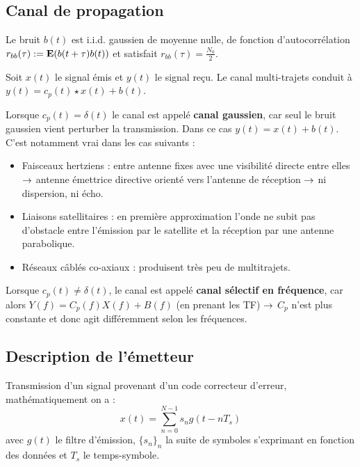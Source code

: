 \subsection{Canal de propagation}

	\begin{hyp}
		Le bruit $b(t)$ est i.i.d. gaussien de moyenne nulle, de fonction d'autocorrélation $r_{bb}(\tau) := \mathbf{E}(b(t + \tau) b(t))$ et satisfait $r_{bb}(\tau) = \frac{N_0}{2}$.
	\end{hyp}
	
	\begin{pop}
		Soit $x(t)$ le signal émis et $y(t)$ le signal reçu.
		Le canal multi-trajets conduit à $y(t) = c_p(t) \star x(t) + b(t)$.
	\end{pop}
	
	Lorsque $c_p(t) = \delta(t)$ le canal est appelé \textbf{canal gaussien}, car seul le bruit gaussien vient perturber la transmission.
	Dans ce cas $y(t) = x(t) + b(t)$.
	C'est notamment vrai dans les cas suivants :
	\begin{itemize}
	\item[\textbullet] Faisceaux hertziens : entre antenne fixes avec une visibilité directe entre elles $\rightarrow$ antenne émettrice directive orienté vers l'antenne de réception $\rightarrow$ ni dispersion, ni écho.
	\item[\textbullet] Liaisons satellitaires : en première approximation l'onde ne subit pas d'obstacle entre l'émission par le satellite et la réception par une antenne parabolique.
	\item[\textbullet] Réseaux câblés co-axiaux : produisent très peu de multitrajets.
	\end{itemize}
	
	Lorsque $c_p(t) \neq \delta(t)$, le canal est appelé \textbf{canal sélectif en fréquence}, car alors $Y(f) = C_p(f) X(f) + B(f)$ (en prenant les TF) $\rightarrow$ $C_p$ n'est plus constante et donc agit différemment selon les fréquences.
		

\subsection{Description de l'émetteur}

	\begin{defn}
	Transmission d'un signal provenant d'un code correcteur d'erreur, mathématiquement on a :
	$$x(t)=\sum_{n=0}^{N-1} s_{n}g(t-nT_{s})$$
	avec $g(t)$ le filtre d'émission, $\{s_{n}\}_{n}$ la suite de symboles s'exprimant en fonction des données et $T_{s}$ le temps-symbole.
	\end{defn}
	

